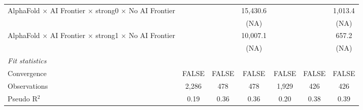 \begin{tabular}{lcccccc}
   AlphaFold $\times$ AI Frontier $\times$ strong0 $\times$ No AI Frontier    &                        &         & 15,430.6 &                        &       & 1,013.4\\   
                                                                              &                        &         & (NA)     &                        &       & (NA)\\   
   AlphaFold $\times$ AI Frontier $\times$ strong1 $\times$ No AI Frontier    &                        &         & 10,007.1 &                        &       & 657.2\\   
                                                                              &                        &         & (NA)     &                        &       & (NA)\\   
   \midrule
   \emph{Fit statistics}\\
   Convergence                                                                &FALSE                   & FALSE   & FALSE    & FALSE                  & FALSE & FALSE\\  
   Observations                                                               & 2,286                  & 478     & 478      & 1,929                  & 426   & 426\\  
   Pseudo R$^2$                                                               & 0.19                   & 0.36    & 0.36     & 0.20                   & 0.38  & 0.39\\  
   

\end{tabular}
